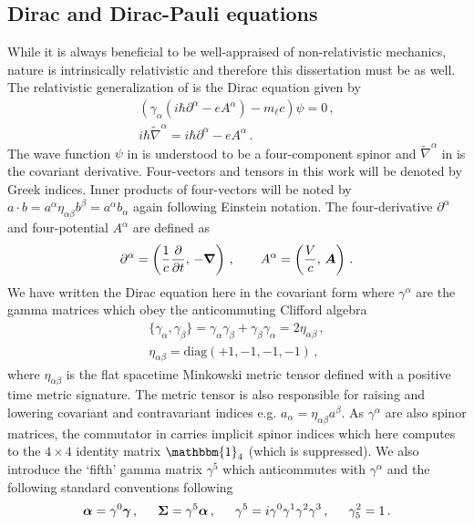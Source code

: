 \subsection{Dirac and Dirac-Pauli equations}
\label{sec:dp}
\noindent While it is always beneficial to be well-appraised of non-relativistic mechanics, nature is intrinsically relativistic and therefore this dissertation must be as well. The relativistic generalization of  is the Dirac equation given by
\begin{gather}
    \label{dirac:1a}
    \left(\gamma_{\alpha}\left(i\hbar\partial^{\alpha} - eA^{\alpha}\right)-m_{\ell}c\right)\psi=0\,,\\
    \label{dirac:1b}
    i\hbar{\widetilde\nabla}^{\alpha}=i\hbar\partial^{\alpha}-eA^{\alpha}\,.
\end{gather}
The wave function $\psi$ in  is understood to be a four-component spinor and $\widetilde\nabla^{\alpha}$ in  is the covariant derivative. Four-vectors and tensors in this work will be denoted by Greek indices. Inner products of four-vectors will be noted by $a\cdot b=a^{\alpha}\eta_{\alpha\beta}b^{\beta}=a^{\alpha}b_{\alpha}$ again following Einstein notation. The four-derivative $\partial^{\alpha}$ and four-potential $A^{\alpha}$ are defined as
\begin{gather}
    \label{dirac:2}
    \partial^{\alpha}=\left(\frac{1}{c}\frac{\partial}{\partial t},\,-\boldsymbol{\nabla}\right)\,,\qquad A^{\alpha}=\left(\frac{V}{c},\,\boldsymbol{A}\right)\,.
\end{gather}
We have written the Dirac equation here in the covariant form where $\gamma^{\alpha}$ are the gamma matrices which obey the anticommuting Clifford algebra
\begin{gather}
    \label{gamma:1}
    \{\gamma_{\alpha},\gamma_{\beta}\}=\gamma_{\alpha}\gamma_{\beta} + \gamma_{\beta}\gamma_{\alpha} = 2\eta_{\alpha\beta}\,,\\
    \eta_{\alpha\beta}=\mathrm{diag}(+1,-1,-1,-1)\,,
\end{gather}
where $\eta_{\alpha\beta}$ is the flat spacetime Minkowski metric tensor defined with a positive time metric signature. The metric tensor is also responsible for raising and lowering covariant and contravariant indices e.g. $a_{\alpha}=\eta_{\alpha\beta}a^{\beta}$. As $\gamma^{\alpha}$ are also spinor matrices, the commutator in  carries implicit spinor indices which here computes to the $4\times4$ identity matrix $\mathbbm{1}_{4}$ (which is suppressed). We also introduce the `fifth' gamma matrix $\gamma^{5}$ which anticommutes with $\gamma^{\alpha}$ and the following standard conventions following~\cite{Itzykson:1980rh}
\begin{alignat}{1}
	\label{conventions:1} \bb{\alpha}=\gamma^{0}\bb{\gamma}\,,\indent \bb{\Sigma}=\gamma^{5}\bb{\alpha}\,,\indent \gamma^{5}=i\gamma^{0}\gamma^{1}\gamma^{2}\gamma^{3}\,,\indent \gamma^{2}_{5}=1\,.
\end{alignat}

